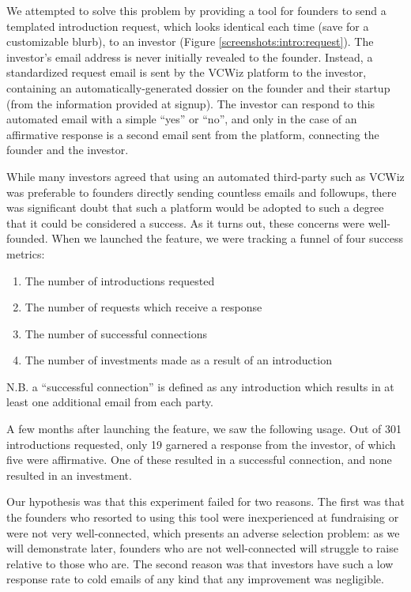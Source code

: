 We attempted to solve this problem by providing a tool for founders to send a templated introduction request, which looks identical each time (save for a customizable blurb), to an investor (Figure \ref{screenshots:intro:request}). The investor's email address is never initially revealed to the founder. Instead, a standardized request email is sent by the VCWiz platform to the investor, containing an automatically-generated dossier on the founder and their startup (from the information provided at signup). The investor can respond to this automated email with a simple ``yes'' or ``no'', and only in the case of an affirmative response is a second email sent from the platform, connecting the founder and the investor.

While many investors agreed that using an automated third-party such as VCWiz was preferable to founders directly sending countless emails and followups, there was significant doubt that such a platform would be adopted to such a degree that it could be considered a success. As it turns out, these concerns were well-founded. When we launched the feature, we were tracking a funnel of four success metrics:

\begin{enumerate}
  \item The number of introductions requested
  \item The number of requests which receive a response
  \item The number of successful connections
  \item The number of investments made as a result of an introduction
\end{enumerate}

N.B. a ``successful connection'' is defined as any introduction which results in at least one additional email from each party.

A few months after launching the feature, we saw the following usage. Out of 301 introductions requested, only 19 garnered a response from the investor, of which five were affirmative. One of these resulted in a successful connection, and none resulted in an investment.

Our hypothesis was that this experiment failed for two reasons. The first was that the founders who resorted to using this tool were inexperienced at fundraising or were not very well-connected, which presents an adverse selection problem: as we will demonstrate later, founders who are not well-connected will struggle to raise relative to those who are. The second reason was that investors have such a low response rate to cold emails of any kind that any improvement was negligible.

